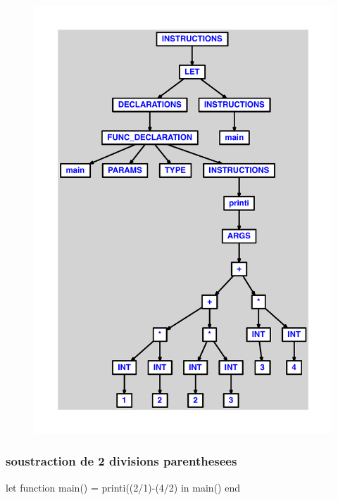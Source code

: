 \documentclass{article}
\begin{document}
\begin{figure}[H]\centering\includegraphics[max width=\textwidth]{ast/ast_108.pdf}\end{figure}\subsubsection{soustraction de 2 divisions parenthesees}
\begin{verbatimtab}
let function main() = printi((2/1)-(4/2) in main() end
\end{verbatimtab}
\end{document}
